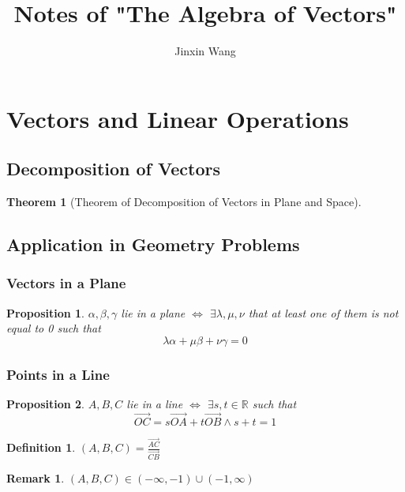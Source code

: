 \documentclass[onecolumn]{ctexart}
\title{Notes of "The Algebra of Vectors"}
\author{Jinxin Wang}
\date{}
\newtheorem{definition}{Definition}
\newtheorem{theorem}{Theorem}
\newtheorem{proposition}{Proposition}
\newtheorem{remark}{Remark}
\begin{document}
\maketitle

\section{Vectors and Linear Operations}

\subsection{Decomposition of Vectors}

\begin{theorem}[Theorem of Decomposition of Vectors in Plane and Space]
  
\end{theorem}

\subsection{Application in Geometry Problems}

\subsubsection{Vectors in a Plane}

\begin{proposition}
  $\alpha, \beta, \gamma$ lie in a plane $\Leftrightarrow$ $\exists \lambda, \mu, 
  \nu$ that at least one of them is not equal to 0 such that
  \begin{equation}
    \lambda \alpha + \mu \beta + \nu \gamma = 0
  \end{equation}
\end{proposition}

\subsubsection{Points in a Line}

\begin{proposition}
  $A, B, C$ lie in a line $\Leftrightarrow$ $\exists s, t \in \mathbb{R}$ such 
  that
  \begin{equation}
    \vec{OC} = s \vec{OA} + t \vec{OB} \wedge s + t = 1
  \end{equation}
\end{proposition}

\begin{definition}
  $(A, B, C) = \frac{\vec{AC}}{\vec{CB}}$
\end{definition}
\begin{remark}
  $(A, B, C) \in (-\infty, -1) \cup (-1, \infty)$
\end{remark}
\end{document}
